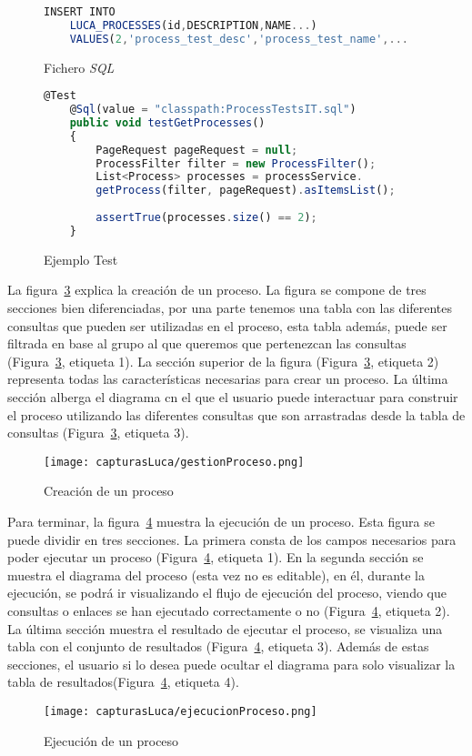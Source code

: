 \begin{figure}[!tb]
	\centering
	\begin{lstlisting}[language=Javascript]
	INSERT INTO 
	LUCA_PROCESSES(id,DESCRIPTION,NAME...)
	VALUES(2,'process_test_desc','process_test_name',...\end{lstlisting}
	\caption{Fichero \emph{SQL}}
	\label{fig:sqlFile}
\end{figure}
\begin{figure}[!tb]
	\centering
	\begin{lstlisting}[language=Javascript]
	@Test
	@Sql(value = "classpath:ProcessTestsIT.sql")
	public void testGetProcesses()
	{
		PageRequest pageRequest = null;
		ProcessFilter filter = new ProcessFilter();
		List<Process> processes = processService.
		getProcess(filter, pageRequest).asItemsList();
		
		assertTrue(processes.size() == 2);
	}\end{lstlisting}
	\caption{Ejemplo Test}
	\label{fig:testExample}
\end{figure}

La figura~\ref{fig:gestionProceso} explica la creación de un proceso. La figura se compone de tres secciones bien diferenciadas, por una parte tenemos una tabla con las diferentes consultas que pueden ser utilizadas en el proceso, esta tabla además, puede ser filtrada en base al grupo al que queremos que pertenezcan las consultas (Figura~\ref{fig:gestionProceso}, etiqueta 1). La sección superior de la figura (Figura~\ref{fig:gestionProceso}, etiqueta 2) representa todas las características necesarias para crear un proceso. La última sección alberga el diagrama cn el que el usuario puede interactuar para construir el proceso utilizando las diferentes consultas que son arrastradas desde la tabla de consultas (Figura~\ref{fig:gestionProceso}, etiqueta 3).


\begin{figure}[!tb]
	\centering
	\texttt{[image: capturasLuca/gestionProceso.png]}
	\caption{Creación de un proceso}
	\label{fig:gestionProceso}
\end{figure}

Para terminar, la figura~\ref{fig:ejecucionProceso} muestra la ejecución de un proceso. Esta figura se puede dividir en tres secciones. La primera consta de los campos necesarios para poder ejecutar un proceso (Figura~\ref{fig:ejecucionProceso}, etiqueta 1). En la segunda sección se muestra el diagrama del proceso (esta vez no es editable), en él, durante la ejecución, se podrá ir visualizando el flujo de ejecución del proceso, viendo que consultas o enlaces se han ejecutado correctamente o no (Figura~\ref{fig:ejecucionProceso}, etiqueta 2). La última sección muestra el resultado de ejecutar el proceso, se visualiza una tabla con el conjunto de resultados (Figura~\ref{fig:ejecucionProceso}, etiqueta 3). Además de estas secciones, el usuario si lo desea puede ocultar el diagrama para solo visualizar la tabla de resultados(Figura~\ref{fig:ejecucionProceso}, etiqueta 4).


\begin{figure}[!tb]
	\centering
	\texttt{[image: capturasLuca/ejecucionProceso.png]}
	\caption{Ejecución de un proceso}
	\label{fig:ejecucionProceso}
\end{figure}




